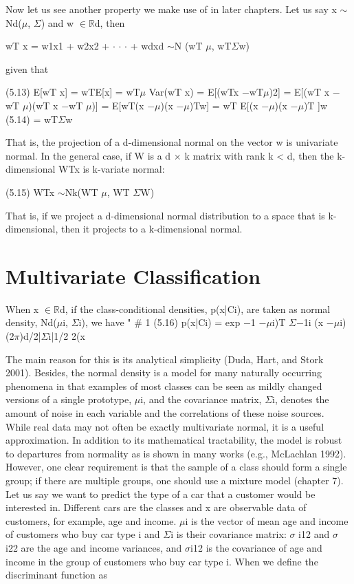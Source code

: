 Now let us see another property we make use of in later chapters. Let us say x $\sim$Nd($\mu$, $\Sigma$) and w $\in$$\mathbb{R}$d, then

wT x = w1x1 + w2x2 + $\cdot$ $\cdot$ $\cdot$ + wdxd $\sim$N (wT $\mu$, wT$\Sigma$w)

given that

(5.13) E[wT x] = wTE[x] = wT$\mu$ Var(wT x) = E[(wTx $-$wT$\mu$)2] = E[(wT x $-$wT $\mu$)(wT x $-$wT $\mu$)] = E[wT(x $-$$\mu$)(x $-$$\mu$)Tw] = wT E[(x $-$$\mu$)(x $-$$\mu$)T ]w (5.14) = wT$\Sigma$w

That is, the projection of a d-dimensional normal on the vector w is univariate normal. In the general case, if W is a d $\times$ k matrix with rank k < d, then the k-dimensional WTx is k-variate normal:

(5.15) WTx $\sim$Nk(WT $\mu$, WT $\Sigma$W)

That is, if we project a d-dimensional normal distribution to a space that is k-dimensional, then it projects to a k-dimensional normal.

\section{Multivariate Classification}

When x $\in$$\mathbb{R}$d, if the class-conditional densities, p(x|Ci), are taken as normal density, Nd($\mu$i, $\Sigma$i), we have " \# 1 (5.16) p(x|Ci) = exp $-$1 $-$$\mu$i)T $\Sigma$$-$1i (x $-$$\mu$i) (2$\pi$)d/2|$\Sigma$i|1/2 2(x

The main reason for this is its analytical simplicity (Duda, Hart, and Stork 2001). Besides, the normal density is a model for many naturally occurring phenomena in that examples of most classes can be seen as mildly changed versions of a single prototype, $\mu$i, and the covariance matrix, $\Sigma$i, denotes the amount of noise in each variable and the correlations of these noise sources. While real data may not often be exactly multivariate normal, it is a useful approximation. In addition to its mathematical tractability, the model is robust to departures from normality as is shown in many works (e.g., McLachlan 1992). However, one clear requirement is that the sample of a class should form a single group; if there are multiple groups, one should use a mixture model (chapter 7). Let us say we want to predict the type of a car that a customer would be interested in. Different cars are the classes and x are observable data of customers, for example, age and income. $\mu$i is the vector of mean age and income of customers who buy car type i and $\Sigma$i is their covariance matrix: $\sigma$ i12 and $\sigma$ i22 are the age and income variances, and $\sigma$i12 is the covariance of age and income in the group of customers who buy car type i. When we define the discriminant function as

